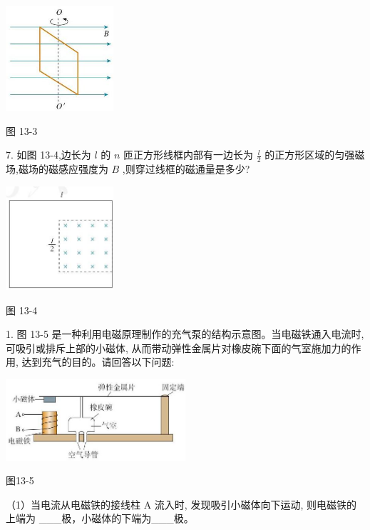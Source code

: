 \documentclass[10pt]{article}
\begin{document}
\begin{center}
\includegraphics[max width=0.3\textwidth]{images/01911d5f-8e38-70c0-b5b8-2b399bd115b6_134_918872.jpg}
\end{center}

图 13-3

7. 如图 13-4,边长为 \(l\) 的 \(n\) 匝正方形线框内部有一边长为 \(\frac{l}{2}\) 的正方形区域的匀强磁场,磁场的磁感应强度为 \(B\) ,则穿过线框的磁通量是多少?

\begin{center}
\includegraphics[max width=0.3\textwidth]{images/01911d5f-8e38-70c0-b5b8-2b399bd115b6_134_459356.jpg}
\end{center}

图 13-4

1. 图 13-5 是一种利用电磁原理制作的充气泵的结构示意图。当电磁铁通入电流时, 可吸引或排斥上部的小磁体, 从而带动弹性金属片对橡皮碗下面的气室施加力的作用, 达到充气的目的。请回答以下问题:

\begin{center}
\includegraphics[max width=0.5\textwidth]{images/01911d5f-8e38-70c0-b5b8-2b399bd115b6_135_626069.jpg}
\end{center}

图13-5

（1）当电流从电磁铁的接线柱 \(\mathrm{A}\) 流入时, 发现吸引小磁体向下运动, 则电磁铁的上端为 \_\_\_极，小磁体的下端为\_\_\_极。
\end{document}
